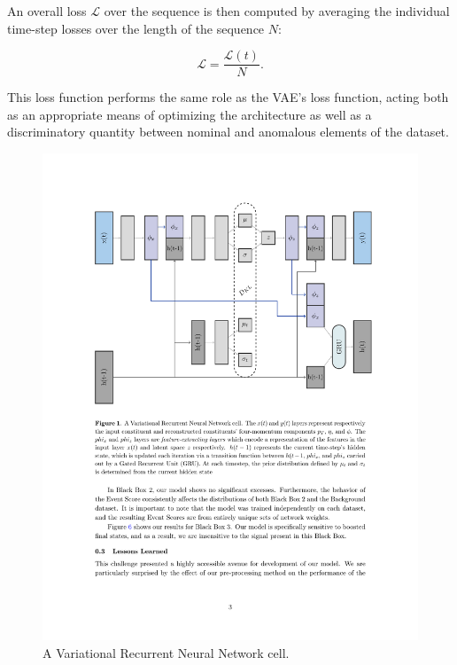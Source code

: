 \documentclass[11pt, a4paper]{article}
\begin{document}
An overall loss $\mathcal{L}$ over the sequence is then computed by averaging the individual time-step losses over the length of the sequence $N$:

\begin{equation}
\mathcal{L} = \frac{\mathcal{L}(t)}{N}.
\end{equation} 

This loss function performs the same role as the VAE's loss function, acting both as an appropriate means of optimizing the architecture as well as a discriminatory quantity between nominal and anomalous elements of the dataset.

\begin{figure}[H]
	\begin{center}
		\includegraphics[width=420pt]{imgs/VRNN_Diagram.pdf}
	\end{center}
	\caption{A Variational Recurrent Neural Network cell.}
	\label{fig:VRNN}
\end{figure}
\end{document}
